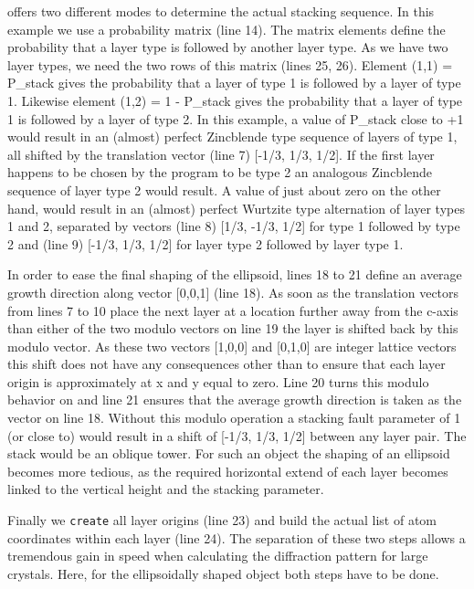 \Discus offers two different modes to determine the actual stacking sequence.
In this example we use a probability matrix (line 14). The matrix elements
define the probability that a layer type is followed by another layer type.
As we have two layer types, we need the two rows of this matrix (lines 25, 26).
Element (1,1) = P\_stack gives the probability that a layer of type 1 is
followed by a layer of type 1. Likewise element (1,2) = 1 - P\_stack gives the 
probability that a layer of type 1 is followed by a layer of type 2.
In this example, a value of P\_stack close to +1 would result in an (almost)
perfect Zincblende type sequence of layers of type 1, all shifted by the 
translation vector (line 7) [-1/3, 1/3, 1/2]. If the first layer happens 
to be chosen by the program to be type 2 an analogous Zincblende sequence of
layer type 2 would result. A value of just about zero on the other hand,
would result in an (almost) perfect Wurtzite type alternation of layer 
types 1 and 2, separated by vectors (line 8) [1/3, -1/3, 1/2] for type 1 
followed by type 2 and (line 9) [-1/3, 1/3, 1/2] for layer type 2 followed 
by layer type 1.

In order to ease the final shaping of the ellipsoid, lines 18 to 21 define
an average growth direction along vector [0,0,1] (line 18). As soon as the
translation vectors from lines 7 to 10 place the next layer at a location
further away from the c-axis than either of the two modulo vectors on line 19
the layer is shifted back by this modulo vector. As these two vectors [1,0,0]
and [0,1,0] are integer lattice vectors this shift does not have any 
consequences other than to ensure that each layer origin is approximately
at x and y equal to zero. Line 20 turns this modulo behavior on and
line 21 ensures that the average growth direction is taken as the vector 
on line 18. Without this modulo operation a stacking fault parameter of
1 (or close to) would result in a shift of [-1/3, 1/3, 1/2] between any
layer pair. The stack would be an oblique tower. For such an object the 
shaping of an ellipsoid becomes more tedious, as the required horizontal
extend of each layer becomes linked to the vertical height and the stacking
parameter.

Finally we {\tt create} all layer origins (line 23) and build the actual
list of atom coordinates within each layer (line 24). The separation of 
these two steps allows \Discus a tremendous gain in speed when calculating
the diffraction pattern for large crystals. Here, for the ellipsoidally
shaped object both steps have to be done.

